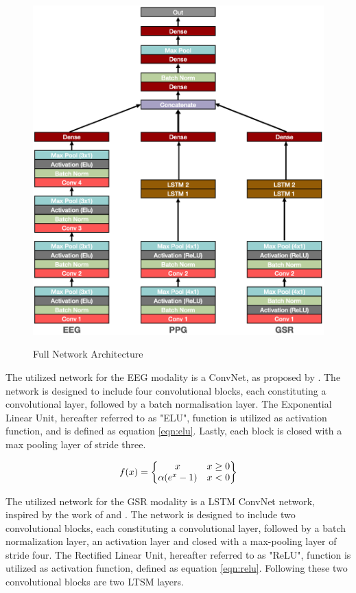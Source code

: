\documentclass[12pt]{article}
\begin{document}
\begin{figure}
\caption{Full Network Architecture}
\bigskip
\includegraphics[scale=0.725]{model_architecture}
\label{fig:architecture}
\end{figure}

The utilized network for the EEG modality is a ConvNet, as proposed by . The network is designed to include four convolutional blocks, each constituting a convolutional layer, followed by a batch normalisation layer. The Exponential Linear Unit, hereafter referred to as "ELU", function is utilized as activation function, and is defined as equation \ref{eqn:elu}. Lastly, each block is closed with a max pooling layer of stride three.

\begin{equation}
\label{eqn:elu}
f(x)= 
\begin{Bmatrix}
x & x \geq0 \\ 
\alpha (e^x -1) & x<0
\end{Bmatrix}
\bigskip
\end{equation}

The utilized network for the GSR modality is a LSTM ConvNet network, inspired by the work of  and  . The network is designed to include two convolutional blocks, each constituting a convolutional layer, followed by a batch normalization layer, an activation layer and closed with a max-pooling layer of stride four. The Rectified Linear Unit, hereafter referred to as "ReLU", function is utilized as activation function, defined as equation \ref{eqn:relu}. Following these two convolutional blocks are two LTSM layers.
\end{document}
